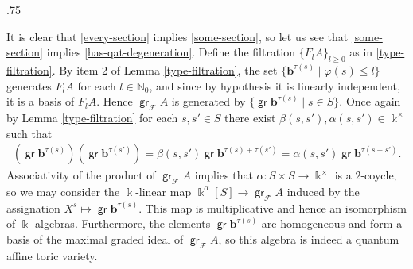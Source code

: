 \documentclass[11pt,fleqn]{article}
\makeatletter
\renewenvironment{proof}[1][\textit{Proof}]{\par
  \pushQED{\qed}%
  \normalfont \topsep.75\paraskip\relax
  \trivlist
  \item[\hskip\labelsep
        \itshape
    #1\@addpunct{.}]\ignorespaces
}{%
  \popQED\endtrivlist\@endpefalse
}
\newcommand\NN{\mathbb N}
\renewcommand\to{\longrightarrow}
\renewcommand\phi{\varphi}
\newcommand\F{\mathcal F}
\renewcommand\b{\mathbf b}
\renewcommand\k{\Bbbk}
\DeclareMathOperator\gr{\mathsf{gr}}
\makeatother
\begin{document}
\begin{proof}
It is clear that \ref{every-section} implies \ref{some-section}, so let us see that
\ref{some-section} implies \ref{has-qat-degeneration}. Define the filtration 
$\{F_l A\}_{l \geq 0}$ as in \ref{type-filtration}. By item 2 of Lemma 
\ref{type-filtration}, the set $\{\b^{\tau(s)} \mid \phi(s) \leq l\}$ generates $F_lA$
for each $l \in \NN_0$, and since by hypothesis it is linearly independent, it is a 
basis of $F_lA$. Hence $\gr_\F A$ is generated by $\{\gr \b^{\tau(s)} \mid s \in S\}$. 
Once again by Lemma \ref{type-filtration} for each $s,s' \in S$ there exist 
$\beta(s,s'), \alpha(s,s') \in \k^\times$ such that
\begin{align*}
(\gr \b^{\tau(s)})(\gr \b^{\tau(s')}) = \beta(s,s') \gr \b^{\tau(s) + \tau(s')} = 
\alpha(s,s') \gr \b^{\tau(s+s')}.
\end{align*}
Associativity of the product of $\gr_\F A$ implies that $\alpha: S \times S \to 
\k^\times$ is a $2$-coycle, so we may consider the $\k$-linear map $\k^\alpha[S] \to 
\gr_\F A$ induced by the assignation $X^s \mapsto \gr \b^{\tau(s)}$. This map is 
multiplicative and hence an isomorphism of $\k$-algebras. Furthermore, the elements $\gr 
\b^{\tau(s)}$ are homogeneous and form a basis of the maximal graded ideal of 
$\gr_\F A$, so this algebra is indeed a quantum affine toric variety.
\end{proof}
\end{document}
